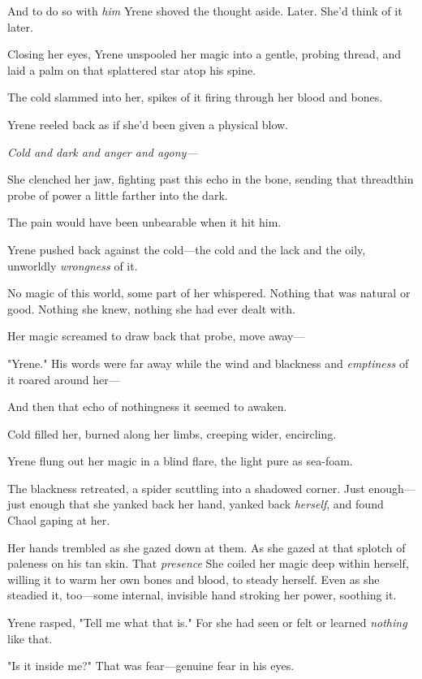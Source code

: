 And to do so with \emph{him}  Yrene shoved the thought aside. Later. She'd think of it later.

Closing her eyes, Yrene unspooled her magic into a gentle, probing thread, and laid a palm on that splattered star atop his spine.

The cold slammed into her, spikes of it firing through her blood and bones.

Yrene reeled back as if she'd been given a physical blow.

\emph{Cold and dark and anger and agony---}

She clenched her jaw, fighting past this echo in the bone, sending that threadthin probe of power a little farther into the dark.

The pain would have been unbearable when it hit him.

Yrene pushed back against the cold---the cold and the lack and the oily, unworldly \emph{wrongness} of it.

No magic of this world, some part of her whispered. Nothing that was natural or good. Nothing she knew, nothing she had ever dealt with.

Her magic screamed to draw back that probe, move away---

"Yrene." His words were far away while the wind and blackness and
\emph{emptiness} of it roared around her---

And then that echo of nothingness  it seemed to awaken.

Cold filled her, burned along her limbs, creeping wider, encircling.

Yrene flung out her magic in a blind flare, the light pure as sea-foam.

The blackness retreated, a spider scuttling into a shadowed corner. Just enough---just enough that she yanked back her hand, yanked back
\emph{herself}, and found Chaol gaping at her.

Her hands trembled as she gazed down at them. As she gazed at that splotch of paleness on his tan skin. That \emph{presence}  She coiled her magic deep within herself, willing it to warm her own bones and blood, to steady herself. Even as she steadied it, too---some internal, invisible hand stroking her power, soothing it.

Yrene rasped, "Tell me what that is." For she had seen or felt or learned \emph{nothing} like that.

"Is it inside me?" That was fear---genuine fear in his eyes.

